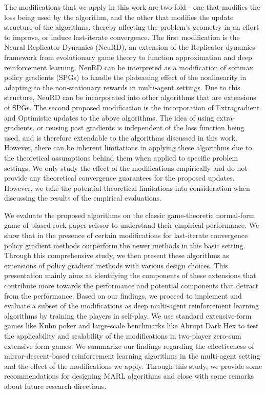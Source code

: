 The modifications that we apply in this work are two-fold - one that modifies the loss being used
by the algorithm, and the other that modifies the update structure of the algorithms, thereby
affecting the problem's geometry in an effort to improve, or induce last-iterate convergence.
The first modification is the Neural Replicator Dynamics (NeuRD), an extension of the Replicator
dynamics framework from evolutionary game theory to function approximation and deep reinforcement
learning.
NeuRD can be interpreted as a modification of softmax policy gradients (SPGs) to handle the
plateauing effect of the nonlinearity in adapting to the non-stationary rewards in multi-agent
settings.
Due to this structure, NeuRD can be incorporated into other algorithms that are extensions of SPGs.
The second proposed modification is the incorporation of Extragradient and Optimistic updates to
the above algorithms.
The idea of using extra-gradients, or reusing past gradients is independent of the loss function
being used, and is therefore extendable to the algorithms discussed in this work.
However, there can be inherent limitations in applying these algorithms due to the theoretical
assumptions behind them when applied to specific problem settings.
We only study the effect of the modifications empirically and do not provide any theoretical
convergence guarantees for the proposed updates.
However, we take the potential theoretical limitations into consideration when discussing the
results of the empirical evaluations.

We evaluate the proposed algorithms on the classic game-theoretic normal-form game of biased
rock-paper-scissor to understand their empirical performance.
We show that in the presence of certain modifications for last-iterate convergence policy gradient
methods outperform the newer methods in this basic setting.
Through this comprehensive study, we then present these algorithms as extensions of policy gradient
methods with various design choices.
This presentation mainly aims at identifying the components of these extensions that contribute
more towards the performance and potential components that detract from the performance.
Based on our findings, we proceed to implement and evaluate a subset of the modifications as deep
multi-agent reinforcement learning algorithms by training the players in self-play.
We use standard extensive-form games like Kuhn poker and large-scale benchmarks like Abrupt Dark
Hex to test the applicability and scalability of the modifications in two-player zero-sum extensive
form games.
We summarize our findings regarding the effectiveness of mirror-descent-based reinforcement
learning algorithms in the multi-agent setting and the effect of the modifications we apply.
Through this study, we provide some recommendations for designing MARL algorithms and close with
some remarks about future research directions.
